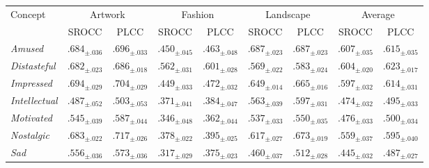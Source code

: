 \begin{tabular}{l cc cc cc cc}
\toprule
\multirow{2}{*}{Concept} & \multicolumn{2}{c}{Artwork} & \multicolumn{2}{c}{Fashion} & \multicolumn{2}{c}{Landscape} & \multicolumn{2}{c}{Average} \\
\cmidrule(lr){2-3}\cmidrule(lr){4-5}\cmidrule(lr){6-7}\cmidrule(lr){8-9}
 & SROCC & PLCC & SROCC & PLCC & SROCC & PLCC & SROCC & PLCC \\
\midrule
\textit{Amused} & $.684_{\pm .036}$ & $.696_{\pm .033}$ & $.450_{\pm .045}$ & $.463_{\pm .048}$ & $\bm{.687_{\pm .023}}$ & $\bm{.687_{\pm .023}}$ & $\bm{.607_{\pm .035}}$ & $.615_{\pm .035}$ \\
\textit{Distasteful} & $.682_{\pm .023}$ & $.686_{\pm .018}$ & $\bm{.562_{\pm .031}}$ & $\bm{.601_{\pm .028}}$ & $.569_{\pm .022}$ & $.583_{\pm .024}$ & $.604_{\pm .020}$ & $\bm{.623_{\pm .017}}$ \\
\textit{Impressed} & $\bm{.694_{\pm .029}}$ & $.704_{\pm .029}$ & $.449_{\pm .033}$ & $.472_{\pm .032}$ & $.649_{\pm .014}$ & $.665_{\pm .016}$ & $.597_{\pm .032}$ & $.614_{\pm .031}$ \\
\textit{Intellectual} & $.487_{\pm .052}$ & $.503_{\pm .053}$ & $.371_{\pm .041}$ & $.384_{\pm .047}$ & $.563_{\pm .039}$ & $.597_{\pm .031}$ & $.474_{\pm .032}$ & $.495_{\pm .033}$ \\
\textit{Motivated} & $.545_{\pm .039}$ & $.587_{\pm .044}$ & $.346_{\pm .048}$ & $.362_{\pm .044}$ & $.537_{\pm .033}$ & $.550_{\pm .035}$ & $.476_{\pm .033}$ & $.500_{\pm .034}$ \\
\textit{Nostalgic} & $.683_{\pm .022}$ & $\bm{.717_{\pm .026}}$ & $.378_{\pm .022}$ & $.395_{\pm .025}$ & $.617_{\pm .027}$ & $.673_{\pm .019}$ & $.559_{\pm .037}$ & $.595_{\pm .040}$ \\
\textit{Sad} & $.556_{\pm .036}$ & $.573_{\pm .036}$ & $.317_{\pm .029}$ & $.375_{\pm .023}$ & $.460_{\pm .037}$ & $.512_{\pm .028}$ & $.445_{\pm .032}$ & $.487_{\pm .027}$ \\
\bottomrule
\end{tabular}
